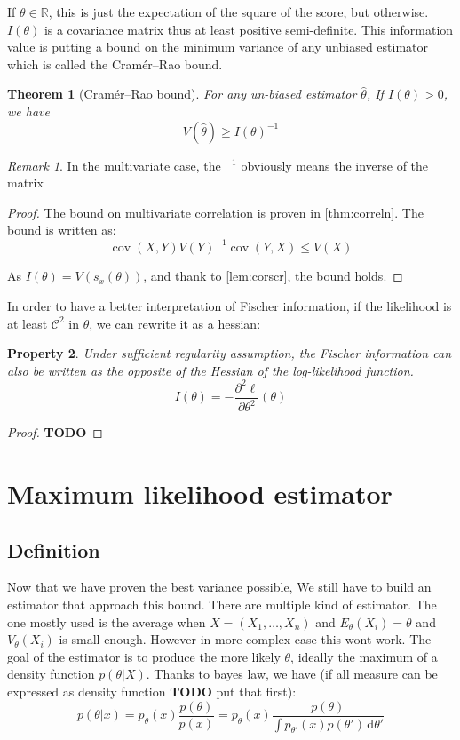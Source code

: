 \documentclass[10pt]{report}
\theoremstyle{plain}
\newtheorem{thm}{Theorem}[chapter]
\newtheorem{prop}[thm]{Property}
\theoremstyle{definition}
\theoremstyle{remark}
\newtheorem*{rem}{Remark}
\newcommand{\R}{\ensuremath{\mathbb{R}}}
\newcommand{\TODO}{\textbf{TODO}}
\newcommand{\dd}{\mathrm{d}}
\renewcommand{\leq}{\leqslant}
\DeclareMathOperator{\cov}{cov}
\newcommand{\class}[1]{{\mathscr{C}^{#1}}}
\begin{document}
If $\theta \in \R$, this is just the expectation of the square of the score, but
otherwise. $I(\theta)$ is a covariance matrix thus at least positive
semi-definite.
This information value is putting a bound on the minimum variance of any
unbiased estimator which is called the Cramér–Rao bound.

\begin{thm}[Cramér–Rao bound]
  For any un-biased estimator $\hat \theta$, If $I(\theta) > 0$, we have
  \[V(\hat{\theta}) \ge {I(\theta)}^{-1}\]
\end{thm}

\begin{rem}
  In the multivariate case, the ${}^{-1}$ obviously means the inverse of the matrix
\end{rem}

\begin{proof}
  The bound on multivariate correlation is proven in \cref{thm:correln}. The
  bound is written as:
  \[\cov(X,Y){V(Y)}^{-1}\cov(Y,X) \leq V(X)\]

  As $I(\theta) = V(s_x(\theta))$, and thank to \cref{lem:corscr}, the bound holds.
\end{proof}

In order to have a better interpretation of Fischer information, if the
likelihood is at least $\class 2$ in $\theta$, we can rewrite
it as a hessian:

\begin{prop}\label{prop:fisherhessian}
  Under sufficient regularity assumption,
  the Fischer information can also be written as the opposite of the Hessian of the
  log-likelihood function.
  \[I(\theta) = -\frac{\partial^2 \ell}{\partial \theta^2}(\theta)\]
\end{prop}

\begin{proof}
  \TODO{}
\end{proof}







\section{Maximum likelihood estimator}

\subsection{Definition}

Now that we have proven the best variance possible, We still have to build an
estimator that approach this bound. There are multiple kind of estimator. The
one mostly used is the average when $X = (X_1,\ldots,X_n)$ and
$E_\theta(X_i) = \theta$ and $V_\theta(X_i)$ is small enough. However in more
complex case this wont work. The goal of the estimator is to produce the more
likely $\theta$, ideally the maximum of a density function $p(\theta | X)$.
Thanks to bayes law, we have (if all measure can be expressed as density
function \textbf{TODO} put that first):
\[p(\theta|x) = p_\theta(x) \frac {p(\theta)}{p(x)}
  = p_\theta(x) \frac {p(\theta)}{\int p_{\theta'}(x)p(\theta')\,\dd \theta'}\]
\end{document}
